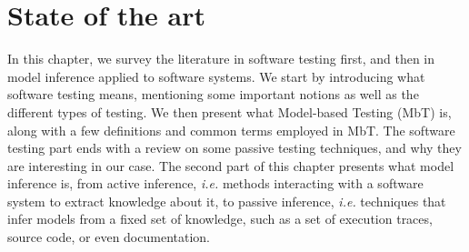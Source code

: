 %
\chapter{State of the art}
\label{sec:related}

In this chapter, we survey the literature in software testing
first, and then in model inference applied to software systems.
We start by introducing what software testing means, mentioning
some important notions as well as the different types of testing.
We then present what Model-based Testing (MbT) is, along with a
few definitions and common terms employed in MbT. The software
testing part ends with a review on some passive testing
techniques, and why they are interesting in our case. The second
part of this chapter presents what model inference is, from
active inference, \emph{i.e.} methods interacting with a software
system to extract knowledge about it, to passive inference,
\emph{i.e.} techniques that infer models from a fixed set of
knowledge, such as a set of execution traces, source code,
or even documentation.\\

\minitoc

\pagebreak





\cleardoublepage
\blankpage
